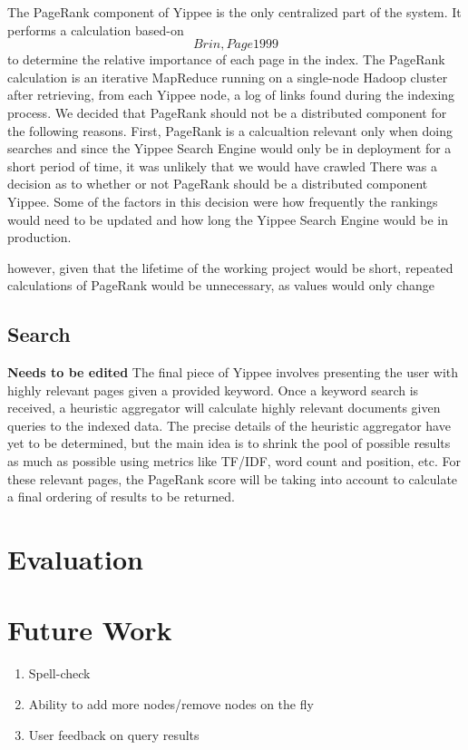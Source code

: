 \documentclass[11pt, letterpaper, oneside, twocolumn]{article}
\begin{document}
The PageRank component of Yippee is the only centralized part of the system.
It performs a calculation based-on \[Brin, Page 1999\]\cite{pagerank} to determine the relative importance of each page in the index.
The PageRank calculation is an iterative MapReduce running on a single-node Hadoop cluster after retrieving, from each Yippee node, a log of links found during the indexing process.
We decided that PageRank should not be a distributed component for the following reasons. 
First, PageRank is a calcualtion relevant only when doing searches and since the Yippee Search Engine would only be in deployment for a short period of time, it was unlikely that we would have crawled 
There was a decision as to whether or not PageRank should be a distributed component Yippee. 
Some of the factors in this decision were how frequently the rankings would need to be updated and how long the Yippee Search Engine would be in production.

however, given that the lifetime of the working project would be short, repeated calculations of PageRank would be unnecessary, as values would only change 

\subsection{Search}
\textbf{Needs to be edited}
The final piece of Yippee involves presenting the user with highly relevant pages given a provided keyword.
Once a keyword search is received, a heuristic aggregator will calculate highly relevant documents given queries to the indexed data.
The precise details of the heuristic aggregator have yet to be determined, but the main idea is to shrink the pool of possible results as much as possible using metrics like TF/IDF, word count and position, etc.
For these relevant pages, the PageRank score will be taking into account to calculate a final ordering of results to be returned.

\section{Evaluation}
\label{sec:evaluation}

\section{Future Work}
\label{sec:future}

\begin{enumerate}
\item Spell-check
\item Ability to add more nodes/remove nodes on the fly
\item User feedback on query results
\end{enumerate}
\end{document}
